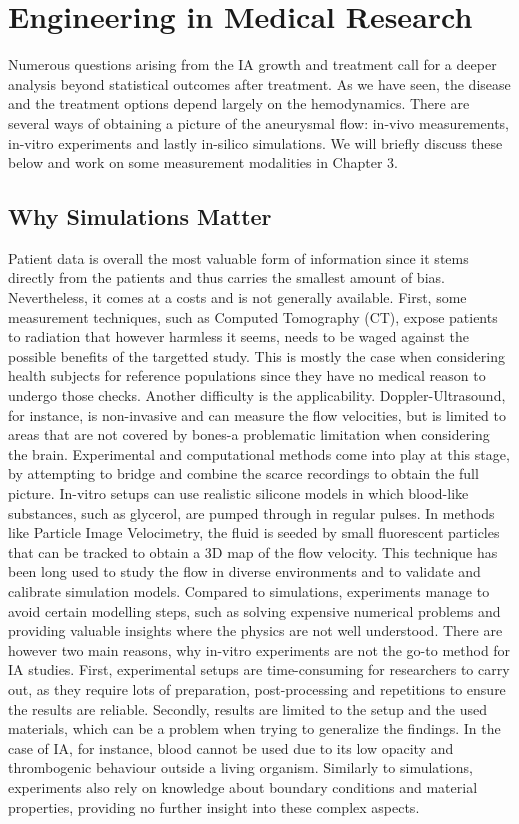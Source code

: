 \section{Engineering in Medical Research}
Numerous questions arising from the IA growth and treatment call for a deeper analysis beyond statistical outcomes after treatment. As we have seen, the disease and the treatment options depend largely on the hemodynamics. There are several ways of obtaining a picture of the aneurysmal flow: in-vivo measurements, in-vitro experiments and lastly in-silico simulations. We will briefly discuss these below and work on some measurement modalities in Chapter 3.

\subsection{Why Simulations Matter}
Patient data is overall the most valuable form of information since it stems directly from the patients and thus carries the smallest amount of bias. Nevertheless, it comes at a costs and is not generally available. First, some measurement techniques, such as Computed Tomography (CT), expose patients to radiation that however harmless it seems, needs to be waged against the possible benefits of the targetted study. This is mostly the case when considering health subjects for reference populations since they have no medical reason to undergo those checks. Another difficulty is the applicability. Doppler-Ultrasound, for instance, is non-invasive and can measure the flow velocities, but is limited to areas that are not covered by bones-a problematic limitation when considering the brain. Experimental and computational methods come into play at this stage, by attempting to bridge and combine the scarce recordings to obtain the full picture. In-vitro setups can use realistic silicone models in which blood-like substances, such as glycerol, are pumped through in regular pulses. In methods like Particle Image Velocimetry, the fluid is seeded by small fluorescent particles that can be tracked to obtain a 3D map of the flow velocity. This technique has been long used to study the flow in diverse environments and to validate and calibrate simulation models. Compared to simulations, experiments manage to avoid certain modelling steps, such as solving expensive numerical problems and providing valuable insights where the physics are not well understood\cite{Sindeev2018}. There are however two main reasons, why in-vitro experiments are not the go-to method for IA studies. First, experimental setups are time-consuming for researchers to carry out, as they require lots of preparation, post-processing and repetitions to ensure the results are reliable. Secondly, results are limited to the setup and the used materials, which can be a problem when trying to generalize the findings. In the case of IA, for instance, blood cannot be used due to its low opacity and thrombogenic behaviour outside a living organism. Similarly to simulations, experiments also rely on knowledge about boundary conditions and material properties, providing no further insight into these complex aspects.


